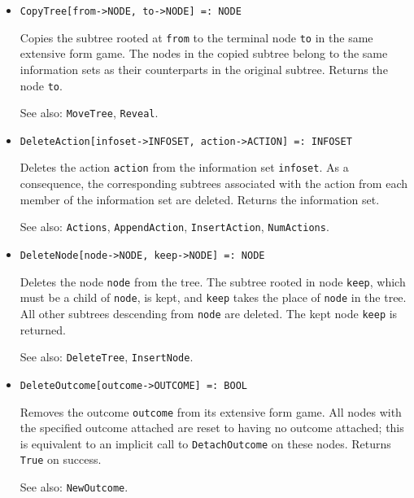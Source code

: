 \begin{itemize}
\item
\protect \large \begin{verbatim}
CopyTree[from->NODE, to->NODE] =: NODE
\end{verbatim}\normalsize

\bd
Copies the subtree rooted at \verb+from+ to the terminal
node \verb+to+ in the same extensive form game.  The nodes in the
copied subtree belong to the same information sets as their counterparts in
the original subtree.  Returns the node \verb+to+.
\item
[See also:] {\tt MoveTree}, {\tt Reveal}.
\ed


\item
\protect \large \begin{verbatim}
DeleteAction[infoset->INFOSET, action->ACTION] =: INFOSET
\end{verbatim}\normalsize

\bd
Deletes the action \verb+action+ from the information set
\verb+infoset+.  As a consequence, the corresponding subtrees associated
with the action from each member of the information set are deleted.
Returns the information set.
\item
[See also:] {\tt Actions}, {\tt AppendAction}, {\tt InsertAction},
{\tt NumActions}.
\ed

\item
\protect \large \begin{verbatim}
DeleteNode[node->NODE, keep->NODE] =: NODE
\end{verbatim}\normalsize

\bd
Deletes the node \verb+node+ from the tree.  The
subtree rooted in node \verb+keep+, which must be a child of
\verb+node+, is kept, and \verb+keep+ takes the place of \verb+node+ in
the tree.  All other subtrees descending from \verb+node+ are deleted.
The kept node \verb+keep+ is returned.
\item
[See also:] {\tt DeleteTree}, {\tt InsertNode}.
\ed

\item
\protect \large \begin{verbatim}
DeleteOutcome[outcome->OUTCOME] =: BOOL
\end{verbatim}\normalsize

\bd
Removes the outcome \verb+outcome+ from its extensive
form game.  All nodes with the specified outcome attached are reset to
having no outcome attached; this is equivalent to an implicit call to
{\tt DetachOutcome} on these nodes.  Returns \verb+True+ on success.
\item
[See also:] {\tt NewOutcome}.
\ed


\end{itemize}
